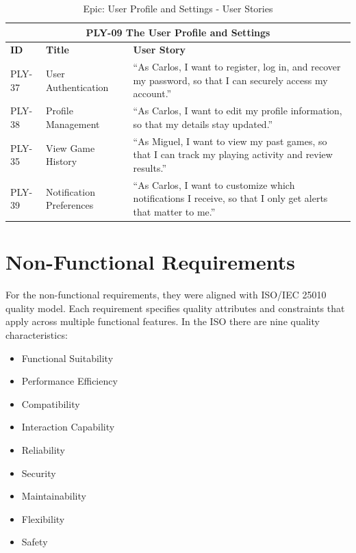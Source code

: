 \begin{table}[h]
	\centering
	\caption{Epic: User Profile and Settings - User Stories}
	\label{tab:epic-profile-settings}
	\begin{tabular}{p{2cm}p{4cm}p{8cm}}
		\toprule
		\multicolumn{3}{c}{\textbf{PLY-09 The User Profile and Settings}}\\
		\midrule
		\textbf{ID} & \textbf{Title} & \textbf{User Story} \\
		\midrule
		PLY-37 & User Authentication & ``As Carlos, I want to register, log in, and recover my password, so that I can securely access my account.'' \\
		\midrule
		PLY-38 & Profile Management & ``As Carlos, I want to edit my profile information, so that my details stay updated.'' \\
		\midrule
		PLY-35 & View Game History & ``As Miguel, I want to view my past games, so that I can track my playing activity and review results.'' \\
		\midrule
		PLY-39 & Notification Preferences & ``As Carlos, I want to customize which notifications I receive, so that I only get alerts that matter to me.'' \\
		\bottomrule
	\end{tabular}
\end{table}

\section{Non-Functional Requirements}
\label{sec:rp-nfr}

For the non-functional requirements, they were aligned with ISO/IEC 25010\cite{ISO25010} quality model. 
Each requirement specifies quality attributes and constraints that apply across multiple functional features.
In the ISO there are nine quality characteristics\cite{ISO25010}:
\begin{itemize}
	\item Functional Suitability
	\item Performance Efficiency
	\item Compatibility
	\item Interaction Capability
	\item Reliability
	\item Security
	\item Maintainability
	\item Flexibility
	\item Safety
\end{itemize}

